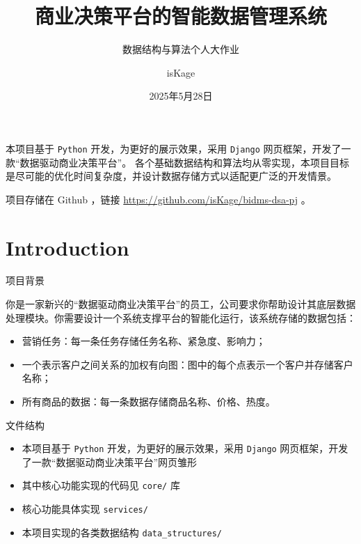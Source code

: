 \documentclass{beamer}
\title{商业决策平台的智能数据管理系统}
\subtitle{数据结构与算法个人大作业}
\author{isKage}
\date{2025年5月28日}
\newcommand{\hrefcol}[2]{\textcolor{cyan}{\href{#1}{#2}}}
\begin{document}
\maketitle

\begin{frame}

本项目基于 \texttt{Python} 开发，为更好的展示效果，采用 \texttt{Django} 网页框架，开发了一款“数据驱动商业决策平台”。
各个基础数据结构和算法均从零实现，本项目目标是尽可能的优化时间复杂度，并设计数据存储方式以适配更广泛的开发情景。

\vspace{\baselineskip}

项目存储在 Github ，链接 \hrefcol{https://github.com/isKage/bidms-dsa-pj}{https://github.com/isKage/bidms-dsa-pj} 。


\end{frame}

\section{Introduction}

\begin{frame}{项目背景}

你是一家新兴的“数据驱动商业决策平台”的员工，公司要求你帮助设计其底层数据处理模块。你需要设计一个系统支撑平台的智能化运行，该系统存储的数据包括：

\begin{itemize}
\item 营销任务：每一条任务存储任务名称、紧急度、影响力；
\item 一个表示客户之间关系的加权有向图：图中的每个点表示一个客户并存储客户名称；
\item 所有商品的数据：每一条数据存储商品名称、价格、热度。
\end{itemize}
\end{frame}

\begin{frame}{文件结构}
\begin{itemize}
\item 本项目基于 \texttt{Python} 开发，为更好的展示效果，采用 \texttt{Django} 网页框架，开发了一款“数据驱动商业决策平台”网页雏形
\item 其中核心功能实现的代码见 \texttt{core/} 库
\item 核心功能具体实现 \texttt{services/}
\item 本项目实现的各类数据结构 \texttt{data\_structures/}
\end{itemize}
\end{frame}
\end{document}
